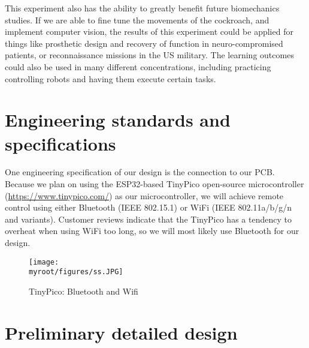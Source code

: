 \documentclass[twocolumn,10pt]{IEEEtran}
\newcommand{\myroot}{.}
\begin{document}
This experiment also has the ability to greatly benefit future biomechanics studies. If we are able to fine tune the movements of the cockroach, and implement computer vision, the results of this experiment could be applied for things like prosthetic design and recovery of function in neuro-compromised patients, or reconnaissance missions in the US military. The learning outcomes could also be used in many different concentrations, including practicing controlling robots and having them execute certain tasks. 

\section{Engineering standards and specifications}
One engineering specification of our design is the connection to our PCB. Because we plan on using the ESP32-based TinyPico open-source microcontroller (\url{https://www.tinypico.com/}) as our microcontroller, we will achieve remote control using either Bluetooth (IEEE 802.15.1) or WiFi (IEEE 802.11a/b/g/n and variants). Customer reviews indicate that the TinyPico has a tendency to overheat when using WiFi too long, so we will most likely use Bluetooth for our design.
\begin{figure}[ht!]
\centering
\texttt{[image: \\myroot/figures/ss.JPG]}
\caption{TinyPico: Bluetooth and Wifi}
\label{fig:ss}
\end{figure}




\section{Preliminary detailed design}
\end{document}
